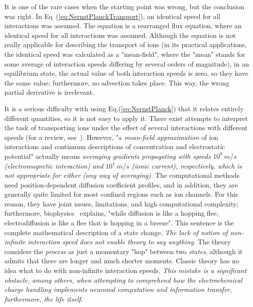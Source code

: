 It is one of the rare cases when the starting point was wrong,
but the conclusion was right.
In Eq~(\ref{eq:NernstPlanckTransport}),  
an identical speed for all interactions was assumed.
The equation is a rearranged flux equation, where 
an identical speed for all interactions was assumed. Although the equation is not really applicable for describing the transport of ions (in its practical applications, the identical speed
was calculated as a "mean-field", where the "mean" stands for some average
of interaction speeds differing by several orders of magnitude), in an equilibrium state, the actual value of both
interaction speeds is zero, so they have the same value; furthermore, no advection takes place. This way, the wrong partial derivative is irrelevant. 


It is a serious difficulty with using Eq.(\ref{eq:NernstPlanck}) that it relates entirely different
quantities, so it is not easy to apply it. There exist attempts to interpret the task of transporting ions under
the effect of several interactions with different speeds (for a review,
see~\cite{Poisson-Boltzmann-Nernst-Planck:2011}). However, "a
\emph{mean-field approximation} of ion interactions and continuum
descriptions of concentration and electrostatic potential" actually
means \emph{averaging gradients propagating with speeds $10^8\ m/s$
(electromagnetic interaction) and $10^1\ m/s$ (ionic current), respectively,
which is not appropriate for either (any way of averaging).} The computational
methods need position-dependent diffusion coefficient profiles, and
in addition, they are generally quite limited for most confined regions
such as ion channels. For this reason, they have joint issues, limitations,
and high computational complexity; furthermore, biophysics~\cite{KochBiophysics:1999}
explains, "while diffusion is like a hopping flee, electrodiffusion
is like a flee that is hopping in a breeze". This sentence is the
complete mathematical description of a state change. \emph{The lack
of notion of non-infinite interaction speed does not enable theory
to say anything}. The theory considers the \emph{process} as just
a momentary "hop" between two \emph{states}, although it
admits that there are longer and much shorter moments. Classic theory
has no idea what to do with non-infinite interaction speeds. \emph{This
mistake is a significant obstacle, among others, when attempting to
comprehend how the electrochemical charge handling implements neuronal
computation and information transfer, furthermore, the life itself. }

